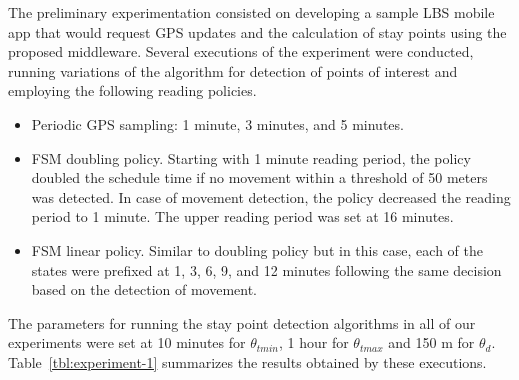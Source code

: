 \documentclass[ENG,PhD]{cinvestav}
\begin{document}
The preliminary experimentation consisted on developing a sample LBS mobile app that would request GPS updates and the calculation of stay points using the proposed middleware.
Several executions of the experiment were conducted, running variations of the algorithm for detection of points of interest and employing the following reading policies.
\begin{itemize}
  \item Periodic GPS sampling: 1 minute, 3 minutes, and 5 minutes.
  \item FSM doubling policy. Starting with 1 minute reading period, the policy doubled the schedule time if no movement within a threshold of 50 meters was detected. In case of movement detection, the policy decreased the reading period to 1 minute.
  The upper reading period was set at 16 minutes.
  \item FSM linear policy. Similar to doubling policy but in this case, each of the states were prefixed at 1, 3, 6, 9, and 12 minutes following the same decision based on the detection of movement.
\end{itemize}
 
The parameters for running the stay point detection algorithms in all of our experiments were set at 10 minutes for $\theta_{tmin}$, 1 hour for $\theta_{tmax}$ and 150 m for $\theta_{d}$.
Table~\ref{tbl:experiment-1} summarizes the results obtained by these executions.
\end{document}
